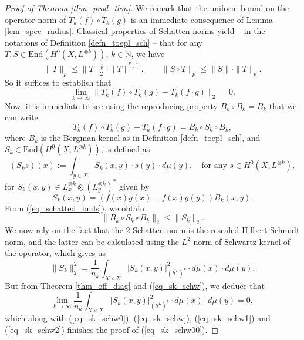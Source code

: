 \documentclass[10pt,a4paper]{amsart}
\newcommand{\enmr}[1]{\text{End}{(#1)}}
\newcommand{\nat}{\mathbb{N}}
\begin{document}
	\begin{proof}[Proof of Theorem \ref{thm_prod_thm}]
		We remark that the uniform bound on the operator norm of $T_k(f) \circ T_k(g)$ is an immediate consequence of Lemma \ref{lem_spec_radius}.
		Classical properties of Schatten norms yield -- in the notations of Definition \ref{defn_toepl_sch} -- that for any $T, S \in {\enmr{H^0(X, L^{\otimes k})}}$, $k \in \nat$, we have
		\begin{equation}\label{eq_schatted_bnds}
			\| T \|_p \leq \| T \|_2^{\frac{1}{p}} \cdot  \| T \|^{\frac{p - 1}{p}}, \qquad \| S \circ T \|_p \leq \| S \| \cdot \| T \|_p.
		\end{equation}
		So it suffices to establish that 
		\begin{equation}\label{eq_sk_schw00}
			\lim_{k \to \infty}
			\| T_k(f) \circ T_k(g) - T_k(f \cdot g) \|_2 
			=
			0.
		\end{equation}
		Now, it is immediate to see using the reproducing property $B_k \circ B_k = B_k$ that we can write
		\begin{equation}\label{eq_sk_schw0}
			T_k(f) \circ T_k(g) - T_k(f \cdot g) 
			=
			B_k \circ S_k \circ B_k,
		\end{equation}
		where $B_k$ is the Bergman kernel as in Definition \ref{defn_toepl_sch}, and $S_k \in {\enmr{H^0(X, L^{\otimes k})}}$, is defined as 
		\begin{equation}
			(S_k s)(x) := \int_{y \in X} S_k(x, y) \cdot s(y) \cdot d \mu(y), \quad \text{for any } s \in H^0(X, L^{\otimes k}),
		\end{equation}
		for $S_k(x, y) \in L^{\otimes k}_x \otimes (L^{\otimes k}_y)^*$ given by
		\begin{equation}\label{eq_sk_schw}
			S_k(x, y) = (f(x) g(x) - f(x) g(y)) B_k(x, y).
		\end{equation}
		From (\ref{eq_schatted_bnds}), we obtain
		\begin{equation}\label{eq_sk_schw1}
			\| B_k \circ S_k \circ B_k \|_2 \leq \| S_k \|_2.
		\end{equation}
		We now rely on the fact that the $2$-Schatten norm is the rescaled Hilbert-Schmidt norm, and the latter can be calculated using the $L^2$-norm of Schwartz kernel of the operator, which gives us 
		\begin{equation}\label{eq_sk_schw2}
			\| S_k \|_2^2
			=
			\frac{1}{n_k} \int_{X \times X} |S_k(x, y)|^{2}_{(h^L)^k} \cdot d \mu(x) \cdot d \mu(y).
		\end{equation}
		But from Theorem \ref{thm_off_diag} and (\ref{eq_sk_schw}), we deduce that 
		\begin{equation}
			\lim_{k \to \infty} \frac{1}{n_k} \int_{X \times X} |S_k(x, y)|^{2}_{(h^L)^k} \cdot d \mu(x) \cdot d \mu(y)
			=
			0,
		\end{equation}
		which along with (\ref{eq_sk_schw0}), (\ref{eq_sk_schw}), (\ref{eq_sk_schw1}) and (\ref{eq_sk_schw2}) finishes the proof of (\ref{eq_sk_schw00}).
	\end{proof}
\end{document}
